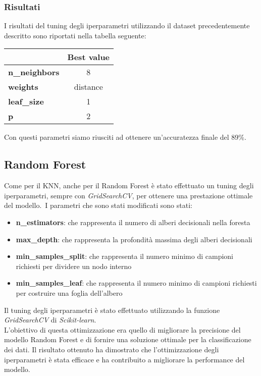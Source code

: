 \documentclass[../../Report.tex]{subfiles}
\begin{document}
\subsubsection{Risultati}
I risultati del tuning degli iperparametri utilizzando il dataset precedentemente descritto sono riportati nella tabella seguente:

\begin{table}[H]
    \centering
    \begin{tabular}{|l|c|}
        \hline
         & \textbf{Best value} \\
        \hline
        \textbf{n\_neighbors} & 8 \\
        \hline
        \textbf{weights} & distance \\
        \hline
        \textbf{leaf\_size} & 1 \\
        \hline
        \textbf{p} & 2 \\
        \hline
    \end{tabular}
\end{table}

Con questi parametri siamo riusciti ad ottenere un'accuratezza finale del 89\%.\\

\subsection{Random Forest}
Come per il KNN, anche per il Random Forest è stato effettuato un tuning degli iperparametri, sempre con \emph{GridSearchCV}, per ottenere una prestazione ottimale del modello.\
I parametri che sono stati modificati sono stati:
\begin{itemize}
\item \textbf{n\_estimators}: che rappresenta il numero di alberi decisionali nella foresta
\item \textbf{max\_depth}: che rappresenta la profondità massima degli alberi decisionali
\item \textbf{min\_samples\_split}: che rappresenta il numero minimo di campioni richiesti per dividere un nodo interno
\item \textbf{min\_samples\_leaf}: che rappresenta il numero minimo di campioni richiesti per costruire una foglia dell'albero
\end{itemize}
Il tuning degli iperparametri è stato effettuato utilizzando la funzione \emph{GridSearchCV} di \emph{Scikit-learn}.\\
L'obiettivo di questa ottimizzazione era quello di migliorare la precisione del modello Random Forest e di fornire una soluzione ottimale per la classificazione dei dati. Il risultato ottenuto ha dimostrato che l'ottimizzazione degli iperparametri è stata efficace e ha contribuito a migliorare la performance del modello.
\end{document}
